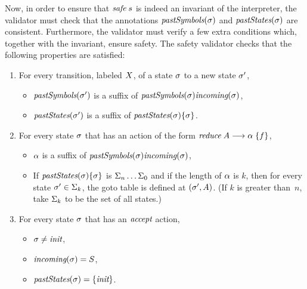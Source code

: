 \documentclass{llncs}
\begin{document}
Now, in order to ensure that $\textit{safe}\;s$ is indeed an invariant of the
interpreter, the validator must check that the annotations $\textit{pastSymbols}(\sigma)$ and
$\textit{pastStates}(\sigma)$ are consistent. Furthermore, the validator must verify a few
extra conditions which, together with the invariant, ensure safety. The
safety validator checks that the following properties are satisfied:
%
\begin{enumerate}
\item For every transition, labeled $X$, of a state $\sigma$ to a new state $\sigma'$,
     \begin{itemize}
     \item $\textit{pastSymbols}(\sigma')$ is a suffix of $\textit{pastSymbols}(\sigma)\textit{incoming}(\sigma)$,
     \item $\textit{pastStates}(\sigma')$ is a suffix of $\textit{pastStates}(\sigma)\{\sigma\}$.
     \end{itemize}
\item For every state $\sigma$ that has an action of the form
      $\textit{reduce}\;A\longrightarrow\alpha\;\{f\}$,
     \begin{itemize}
     \item $\alpha$ is a suffix of $\textit{pastSymbols}(\sigma)\textit{incoming}(\sigma)$,
     \item If $\textit{pastStates}(\sigma)\{\sigma\}$ is $\Sigma_n\ldots\Sigma_0$
           and if the length of $\alpha$ is $k$, then
           for every state $\sigma' \in \Sigma_k$, the
           goto table is defined at $(\sigma', A)$.
           (If $k$ is greater than~$n$, take $\Sigma_k$ to
           be the set of all states.)
     \end{itemize}
\item For every state $\sigma$ that has an $\textit{accept}$ action,
     \begin{itemize}
       \item $\sigma \neq \textit{init}$,
       \item $\textit{incoming}(\sigma) = S$,
       \item $\textit{pastStates}(\sigma) = \{\textit{init}\}$.
     \end{itemize}
\end{enumerate}
\end{document}
